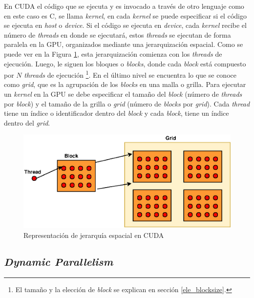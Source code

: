 \documentclass[10pt, conference, compsocconf, onecolumn]{IEEEtran}
\begin{document}
 
 En CUDA el c\'odigo que se ejecuta y es invocado a trav\'es de otro lenguaje como en este caso es C, se llama \textit{kernel}, en cada \textit{kernel} se puede especificar si el c\'odigo se ejecuta en \textit{host} o \textit{device}. Si el c\'odigo se ejecuta en \textit{device}, cada \textit{kernel} recibe el n\'umero de \textit{threads} en donde se ejecutar\'a, estos \textit{threads} se ejecutan de forma paralela en la GPU, organizados mediante una jerarquizaci\'on espacial. Como se puede ver en la Figura \ref{fig_Jerarquia}, esta jerarquizaci\'on comienza con los \textit{threads} de ejecuci\'on. Luego, le siguen los bloques o \textit{blocks}, donde cada \textit{block} est\'a compuesto por $N$ \textit{threads} de ejecuci\'on \footnote{El tama\~no y la elecci\'on de \textit{block} se explican en secci\'on \ref{ele_blocksize}.}. En el \'ultimo nivel se encuentra lo que se conoce como \textit{grid}, que es la agrupaci\'on de los \textit{blocks} en una malla o grilla. Para ejecutar un \textit{kernel} en la GPU se debe especificar el tama\~no del \textit{block} (n\'umero de \textit{threads} por \textit{block}) y el tama\~no de la grilla o \textit{grid} (n\'umero de \textit{blocks} por \textit{grid}). Cada \textit{thread} tiene un \'indice o identificador dentro del \textit{block} y cada \textit{block}, tiene un \'indice dentro del \textit{grid}.
\begin{figure}[H]
	\centering
	\includegraphics[scale=0.8]{figures/Jerarquia_mem.eps}
	\caption{Representaci\'on de jerarqu\'ia espacial en CUDA}
	\label{fig_Jerarquia}
\end{figure}

\subsection{\textit{Dynamic Parallelism}}
\label{sub_sec_ModPD}
\end{document}
